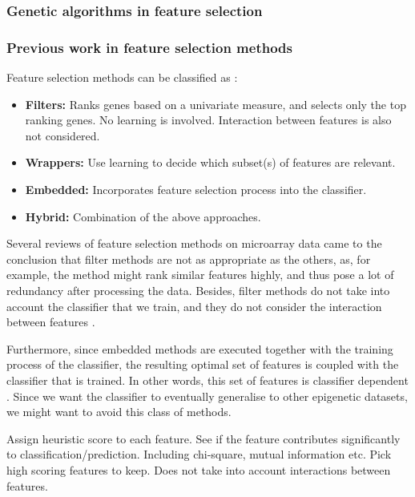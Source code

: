 \documentclass[12pt, twoside, a4paper]{article}
\begin{document}
\subsubsection{Genetic algorithms in feature selection}

\subsubsection{Previous work in feature selection methods} \label{bg:fs:previous}

Feature selection methods can be classified as \cite{RefWorks:117, RefWorks:118}:
\begin{itemize}
\item \textbf{Filters:} Ranks genes based on a univariate measure, and selects only the top ranking genes. No learning is involved. Interaction between features is also not considered.
\item \textbf{Wrappers:} Use learning to decide which subset(s) of features are relevant.
\item \textbf{Embedded:} Incorporates feature selection process into the classifier.
\item \textbf{Hybrid:} Combination of the above approaches.
\end{itemize}

Several reviews of feature selection methods on microarray data \cite{RefWorks:117, RefWorks:118} came to the conclusion that filter methods are not as appropriate as the others, as, for example, the method might rank similar features highly, and thus pose a lot of redundancy after processing the data. Besides, filter methods do not take into account the classifier that we train, and they do not consider the interaction between features \cite{RefWorks:119}.

Furthermore, since embedded methods are executed together with the training process of the classifier, the resulting optimal set of features is coupled with the classifier that is trained. In other words, this set of features is classifier dependent \cite{RefWorks:118}. Since we want the classifier to eventually generalise to other epigenetic datasets, we might want to avoid this class of methods. 

Assign heuristic score to each feature. See if the feature contributes significantly to classification/prediction. Including chi-square, mutual information etc. Pick high scoring features to keep. Does not take into account interactions between features.
\end{document}
